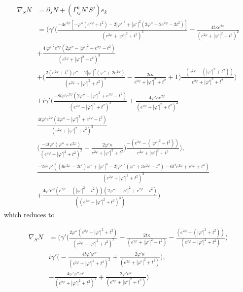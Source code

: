 \documentclass[12pt]{amsart}
\begin{document}
\begin{align*}
    \nabla_S N & = \partial_s N + (\Gamma^k_{ij}N^iS^j)e_k
    \\&= \bigg(\gamma'\bigg(\frac{-4e^{2\varphi}[-\varphi''(e^{2\varphi}+t^2) -2|\varphi'|^4 +|\varphi'|^2(3\varphi'' +2e^{2\varphi} -2t^2) ]}{(e^{2\varphi}+|\varphi'|^2+t^2)^3} - \frac{4t\kappa e^{2\varphi}}{(e^{2\varphi}+|\varphi'|^2+t^2)^2}
    \\&+\frac{4|\varphi'|^2e^{2\varphi}(2\varphi''-|\varphi'|^2+e^{2\varphi}-t^2)}{(e^{2\varphi}+|\varphi'|^2+t^2)^3}
    \\&+\bigg(\frac{2 (e^{2\varphi} + t^2) \varphi'' - 2 |\varphi'|^2 (\varphi'' + 2 e^{2\varphi})}{(e^{2\varphi}+|\varphi'|^2+t^2)^2} - \frac{2t\kappa}{e^{2\varphi} + |\varphi'|^2+t^2} + 1\bigg)\frac{-(e^{2\varphi}-(|\varphi'|^2+t^2))}{e^{2\varphi}+|\varphi'|^2+t^2}\bigg)
    \\&+i\gamma'\bigg(\frac{-8t\varphi'e^{2\varphi}(2 \varphi'' - |\varphi'|^2 + e^{2 \varphi} - t^2)}{(e^{2\varphi}+|\varphi'|^2+t^2)^3}  + \frac{4\varphi'\kappa e^{2\varphi}}{(e^{2\varphi}+|\varphi'|^2+t^2)^2}
    \\&\frac{4t\varphi'e^{2\varphi}(2\varphi''-|\varphi'|^2+e^{2\varphi}-t^2)}{(e^{2\varphi}+|\varphi'|^2+t^2)^3}
    \\&\bigg(\frac{-4t\varphi'(\varphi''+e^{2\varphi})}{(e^{2\varphi}+|\varphi'|^2+t^2)^2}  + \frac{2\varphi'\kappa}{e^{2\varphi} + |\varphi'|^2+t^2} \bigg)\frac{-(e^{2\varphi}-(|\varphi'|^2+t^2))}{e^{2\varphi}+|\varphi'|^2+t^2}\bigg),
    \\&\frac{-2 e^{\varphi} \varphi' ((6 e^{2\varphi} - 2 t^2) \varphi'' + |\varphi'|^4 - 2 |\varphi'|^2 (\varphi'' + 3 e^{2\varphi} - t^2) - 6 t^2 e^{2\varphi} + e^{4\varphi} + t^4)}{(e^{2\varphi}+|\varphi'|^2+t^2)^3}
    \\&+ \frac{4\varphi'e^{\varphi}(e^{2\varphi}-(|\varphi'|^2+t^2))(2\varphi''-|\varphi'|^2+e^{2\varphi}-t^2)}{((e^{2\varphi}+|\varphi'|^2+t^2)^3)} \bigg)
\end{align*}
which reduces to

\begin{equation}\label{eq:SCovariantN}
\begin{split}
    \nabla_S N&=\bigg(\gamma'\bigg(\frac{2\varphi''(e^{2\varphi}-|\varphi'|^2+t^2)}{(e^{2\varphi}+|\varphi'|^2+t^2)^2} - \frac{2t\kappa}{(e^{2\varphi}+|\varphi'|^2+t^2)} - \frac{(e^{2\varphi}-(|\varphi'|^2+t^2))}{(e^{2\varphi}+|\varphi'|^2+t^2)}  \bigg)
    \\& i\gamma'\bigg( -\frac{4t\varphi'\varphi''}{(e^{2\varphi}+|\varphi'|^2+t^2)^2} + \frac{2\varphi'\kappa}{(e^{2\varphi}+|\varphi'|^2+t^2)} \bigg),
    \\&-\frac{4\varphi'\varphi''e^{\varphi}}{(e^{2\varphi}+|\varphi'|^2+t^2)^2} +\frac{2\varphi'e^\varphi}{(e^{2\varphi}+|\varphi'|^2+t^2)} \bigg)
\end{split}
\end{equation}
\end{document}
